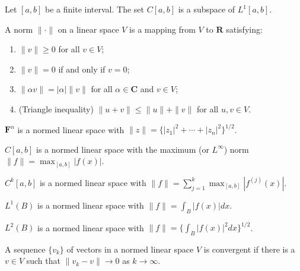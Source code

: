 \documentclass{report}
\begin{document}
    \begin{Example}
    Let $[a, b]$ be a finite interval. The set $C[a, b]$ is a subspace of $L^{1}[a, b]$.
    \end{Example}

    \begin{defBox}
    A norm $\| \cdot \|$ on a linear space $V$ is a mapping from $V$ to $\mathbf{R}$ satisfying:
    \begin{enumerate}
        \item $\|v \| \geq 0$ for all $v \in V$;
        \item $\|v \| = 0$ if and only if $v = 0$;
        \item $\|\alpha v\| = |\alpha| \|v \|$ for all $\alpha \in \mathbf{C}$ and $v \in V$;
        \item (Triangle inequality) $\| u + v \| \leq \| u \| + \| v \|$ for all $u, v \in V$.
    \end{enumerate}
    \end{defBox}

    \begin{Example}
    $\mathbf{F}^{n}$ is a normed linear space with $\| z \| = \{ |z_1|^2 + \cdots + |z_n|^2 \}^{1/2}$.
    \end{Example}

    \begin{Example}
    $C[a, b]$ is a normed linear space with the maximum (or $L^{\infty}$) norm $\| f \| = \max_{[a, b]} |f(x)|$.
    \end{Example}

    \begin{Example}
    $C^{k}[a, b]$ is a normed linear space with $\| f \| = \sum_{j=1}^{k} \max_{[a, b]} |f^{(j)}(x)|$.
    \end{Example}

    \begin{Example}
    $L^{1}(B)$ is a normed linear space with $\| f \| = \int_{B} |f(x)| dx$.
    \end{Example}

    \begin{Example}
    $L^{2}(B)$ is a normed linear space with $\| f \| = \{ \int_{B} |f(x)|^2 dx \}^{1/2}$.
    \end{Example}

    \begin{defBox}
    A sequence $\{v_k\}$ of vectors in a normed linear space $V$ is convergent if there is a $v \in V$ such that $\|v_k - v\| \rightarrow 0$ as $k \rightarrow \infty$.
    \end{defBox}
\end{document}
